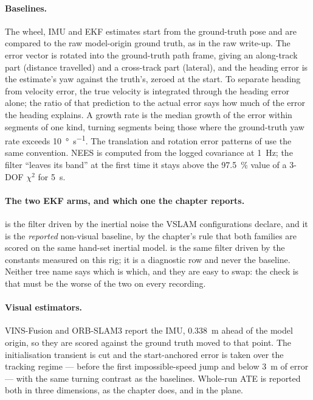 \documentclass[11pt,a4paper,notitlepage]{report}
\begin{document}
\paragraph{Baselines.} The wheel, IMU and EKF estimates start from the
ground-truth pose and are compared to the raw model-origin ground truth, as in
the raw write-up. The error vector is rotated into the ground-truth path
frame, giving an along-track part (distance travelled) and a cross-track part
(lateral), and the heading error is the estimate's yaw against the truth's,
zeroed at the start. To separate heading from velocity error, the true
velocity is integrated through the heading error alone; the ratio of that
prediction to the actual error says how much of the error the heading
explains. A growth rate is the median growth of the error within segments of
one kind, turning segments being those where the ground-truth yaw rate exceeds
\SI{10}{\degree\per\second}. The translation and rotation error patterns of
 use the same convention.
NEES is computed from the logged covariance at \SI{1}{\hertz}; the filter
``leaves its band'' at the first time it stays above the \SI{97.5}{\percent}
value of a 3-DOF $\chi^2$ for \SI{5}{\second}.

\paragraph{The two EKF arms, and which one the chapter reports.}
 is the filter driven by the inertial noise the VSLAM
configurations declare, and it is the \emph{reported} non-visual baseline, by
the chapter's rule that both families are scored on the same hand-set inertial
model.  is the same filter driven by the constants
measured on this rig; it is a diagnostic row and never the baseline. Neither
tree name says which is which, and they are easy to swap: the check is that
 must be the worse of the two on every recording.

\paragraph{Visual estimators.} VINS-Fusion and ORB-SLAM3 report the IMU,
\SI{0.338}{\metre} ahead of the model origin, so they are scored against the
ground truth moved to that point. The initialisation transient is cut and the
start-anchored error is taken over the tracking regime --- before the first
impossible-speed jump and below \SI{3}{\metre} of error --- with the same
turning contrast as the baselines. Whole-run ATE is reported both in three
dimensions, as the chapter does, and in the plane.
\end{document}
